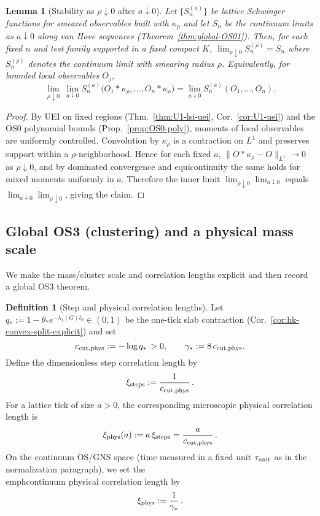 \documentclass[11pt]{amsart}
\theoremstyle{plain}
\newtheorem{lemma}[theorem]{Lemma}
\theoremstyle{definition}
\newtheorem{definition}[theorem]{Definition}
\theoremstyle{remark}
\begin{document}
\begin{lemma}[Stability as $\rho\downarrow 0$ after $a\downarrow 0$]\label{lem:rho-to-zero-stability}
Let $\{S^{(a)}_n\}$ be lattice Schwinger functions for smeared observables built with $\kappa_\rho$ and let $S_n$ be the continuum limits as $a\downarrow 0$ along van Hove sequences (Theorem~\ref{thm:global-OS01}). Then, for each fixed $n$ and test family supported in a fixed compact $K$, $\lim_{\rho\downarrow 0} S_n^{(\rho)}=S_n$ where $S_n^{(\rho)}$ denotes the continuum limit with smearing radius $\rho$. Equivalently, for bounded local observables $O_j$,
\[
  \lim_{\rho\downarrow 0}\ \lim_{a\downarrow 0} S^{(a)}_n\big(O_1\!\ast\!\kappa_\rho,\dots,O_n\!\ast\!\kappa_\rho\big)
  = \lim_{a\downarrow 0} S^{(a)}_n(O_1,\dots,O_n).
\]
\end{lemma}
\begin{proof}
By UEI on fixed regions (Thm.~\ref{thm:U1-lsi-uei}, Cor.~\ref{cor:U1-uei}) and the OS0 polynomial bounds (Prop.~\ref{prop:OS0-poly}), moments of local observables are uniformly controlled. Convolution by $\kappa_\rho$ is a contraction on $L^1$ and preserves support within a $\rho$-neighborhood. Hence for each fixed $a$, $\|O\!\ast\!\kappa_\rho-O\|_{L^1}\to 0$ as $\rho\downarrow 0$, and by dominated convergence and equicontinuity the same holds for mixed moments uniformly in $a$. Therefore the inner limit $\lim_{\rho\downarrow 0}\lim_{a\downarrow 0}$ equals $\lim_{a\downarrow 0}\lim_{\rho\downarrow 0}$, giving the claim.
\end{proof}


\subsection*{Global OS3 (clustering) and a physical mass scale}

\noindent We make the mass/cluster scale and correlation lengths explicit and then record a global OS3 theorem.

\begin{definition}[Step and physical correlation lengths]\label{def:correlation-lengths}
Let $q_*:=1-\theta_* e^{-\lambda_1(G) t_0}\in(0,1)$ be the one-tick slab contraction (Cor.~\ref{cor:hk-convex-split-explicit}) and set
\[
  c_{\rm cut,phys}:=-\log q_*\,>0,\qquad \gamma_*:=8\,c_{\rm cut,phys}.
\]
Define the dimensionless step correlation length by
\[
  \xi_{\rm steps}:=\frac{1}{c_{\rm cut,phys}}\,.
\]
For a lattice tick of size $a>0$, the corresponding microscopic physical correlation length is
\[
  \xi_{\rm phys}(a):=a\,\xi_{\rm steps}=\frac{a}{c_{\rm cut,phys}}\,.
\]
On the continuum OS/GNS space (time measured in a fixed unit $\tau_{\rm unit}$ as in the normalization paragraph), we set the \\emph{continuum} physical correlation length by
\[
  \xi_{\rm phys}:=\frac{1}{\gamma_*}\,.
\]
\end{definition}
\end{document}
